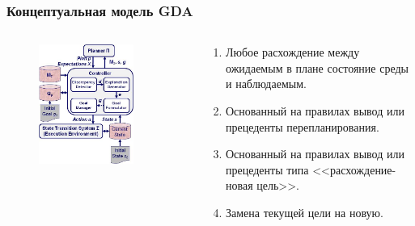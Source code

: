 \documentclass[default]{beamer}
\begin{document}
	\begin{frame}
		\frametitle{Концептуальная модель GDA}
		
		\begin{columns}
			\begin{column}{0.6\textwidth}
				\begin{figure}
					\includegraphics[width=0.8\textwidth]{gda_schema.jpg}
				\end{figure}
			\end{column}
			\begin{column}{0.4\textwidth}
					\begin{enumerate}
						\item Любое расхождение между ожидаемым в плане состояние среды и наблюдаемым.
						\item Основанный на правилах вывод или прецеденты перепланирования.
						\item Основанный на правилах вывод или прецеденты типа <<расхождение-новая цель>>.
						\item Замена текущей цели на новую.
					\end{enumerate}
			\end{column}
		\end{columns}
	\end{frame}
\end{document}
